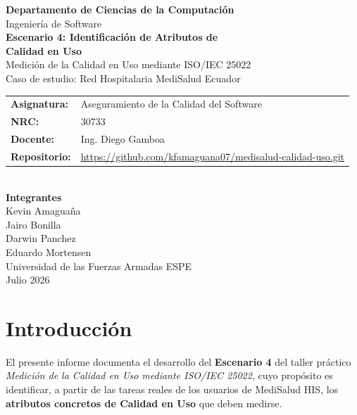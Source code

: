 \documentclass[12pt,a4paper]{article}
\begin{document}
\begin{titlepage}
\centering
{\Large \textbf{Departamento de Ciencias de la Computaci\'on}}\\[0.3cm]
{\large Ingenier\'ia de Software}\\[1.5cm]

{\LARGE \textbf{Escenario 4: Identificaci\'on de Atributos de\\Calidad en Uso}}\\[0.5cm]
{\large Medici\'on de la Calidad en Uso mediante ISO/IEC 25022}\\[0.3cm]
{\large Caso de estudio: Red Hospitalaria MediSalud Ecuador}\\[2cm]

\begin{tabular}{ll}
\textbf{Asignatura:} & Aseguramiento de la Calidad del Software \\
\textbf{NRC:}        & 30733 \\
\textbf{Docente:}    & Ing. Diego Gamboa \\
\textbf{Repositorio:} & \url{https://github.com/kfamaguana07/medisalud-calidad-uso.git} \\
\end{tabular}\\[1.5cm]

\textbf{Integrantes}\\[0.3cm]
Kevin Amagua\~na \\
Jairo Bonilla \\
Darwin Panchez \\
Eduardo Mortensen \\[2cm]

{\large Universidad de las Fuerzas Armadas ESPE}\\[0.3cm]
{\large Julio 2026}
\end{titlepage}

\tableofcontents
\newpage

\section{Introducci\'on}
El presente informe documenta el desarrollo del \textbf{Escenario 4} del taller pr\'actico \textit{Medici\'on de la Calidad en Uso mediante ISO/IEC 25022}, cuyo prop\'osito es identificar, a partir de las tareas reales de los usuarios de MediSalud HIS, los \textbf{atributos concretos de Calidad en Uso} que deben medirse.
\end{document}
